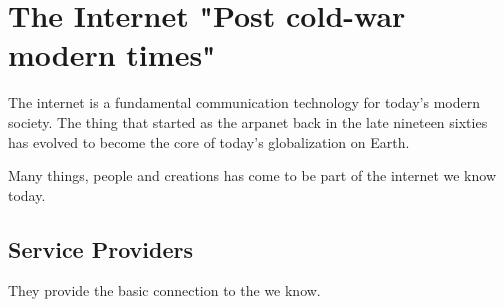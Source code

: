
\chapter[Internet]{The Internet {\footnotesize "Post cold-war modern times"}}

The internet is a fundamental communication technology for today's modern society. The thing that started as the \Gls{arpanet}\cite{wiki:ARPANET} back in the late nineteen sixties has evolved to become the core of today's globalization on Earth.

Many things, people and creations has come to be part of the internet we know today.

\section[SP]{Service Providers}

They provide the basic connection to the  we know.

